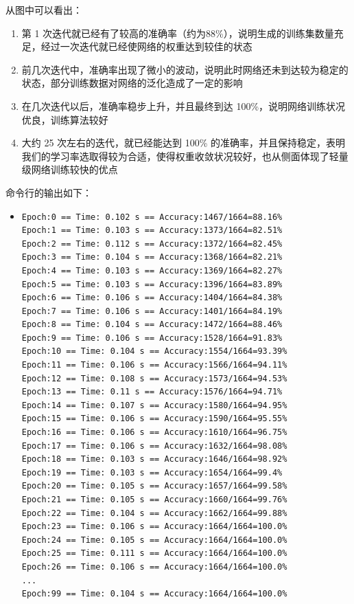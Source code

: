 \documentclass[a4paper, 12pt]{article}
\begin{document}
从图中可以看出：
\begin{enumerate}[leftmargin=*,labelindent=2em]
\item 第 1 次迭代就已经有了较高的准确率（约为88\%），说明生成的训练集数量充足，经过一次迭代就已经使网络的权重达到较佳的状态
\item 前几次迭代中，准确率出现了微小的波动，说明此时网络还未到达较为稳定的状态，部分训练数据对网络的泛化造成了一定的影响
\item 在几次迭代以后，准确率稳步上升，并且最终到达 100\%，说明网络训练状况优良，训练算法较好
\item 大约 25 次左右的迭代，就已经能达到 100\% 的准确率，并且保持稳定，表明我们的学习率选取得较为合适，使得权重收敛状况较好，也从侧面体现了轻量级网络训练较快的优点
\end{enumerate}

\vspace{0.5\baselineskip}
命令行的输出如下：
\begin{itemize}[label={},leftmargin=2em]
\item \begin{lstlisting}[style=plainText,caption={训练过程中的输出}]
Epoch:0 == Time: 0.102 s == Accuracy:1467/1664=88.16%
Epoch:1 == Time: 0.103 s == Accuracy:1373/1664=82.51%
Epoch:2 == Time: 0.112 s == Accuracy:1372/1664=82.45%
Epoch:3 == Time: 0.104 s == Accuracy:1368/1664=82.21%
Epoch:4 == Time: 0.103 s == Accuracy:1369/1664=82.27%
Epoch:5 == Time: 0.103 s == Accuracy:1396/1664=83.89%
Epoch:6 == Time: 0.106 s == Accuracy:1404/1664=84.38%
Epoch:7 == Time: 0.106 s == Accuracy:1401/1664=84.19%
Epoch:8 == Time: 0.104 s == Accuracy:1472/1664=88.46%
Epoch:9 == Time: 0.106 s == Accuracy:1528/1664=91.83%
Epoch:10 == Time: 0.104 s == Accuracy:1554/1664=93.39%
Epoch:11 == Time: 0.106 s == Accuracy:1566/1664=94.11%
Epoch:12 == Time: 0.108 s == Accuracy:1573/1664=94.53%
Epoch:13 == Time: 0.11 s == Accuracy:1576/1664=94.71%
Epoch:14 == Time: 0.107 s == Accuracy:1580/1664=94.95%
Epoch:15 == Time: 0.106 s == Accuracy:1590/1664=95.55%
Epoch:16 == Time: 0.106 s == Accuracy:1610/1664=96.75%
Epoch:17 == Time: 0.106 s == Accuracy:1632/1664=98.08%
Epoch:18 == Time: 0.103 s == Accuracy:1646/1664=98.92%
Epoch:19 == Time: 0.103 s == Accuracy:1654/1664=99.4%
Epoch:20 == Time: 0.105 s == Accuracy:1657/1664=99.58%
Epoch:21 == Time: 0.105 s == Accuracy:1660/1664=99.76%
Epoch:22 == Time: 0.104 s == Accuracy:1662/1664=99.88%
Epoch:23 == Time: 0.106 s == Accuracy:1664/1664=100.0%
Epoch:24 == Time: 0.105 s == Accuracy:1664/1664=100.0%
Epoch:25 == Time: 0.111 s == Accuracy:1664/1664=100.0%
Epoch:26 == Time: 0.106 s == Accuracy:1664/1664=100.0%
...
Epoch:99 == Time: 0.104 s == Accuracy:1664/1664=100.0%
\end{lstlisting}
\end{itemize}
\end{document}
